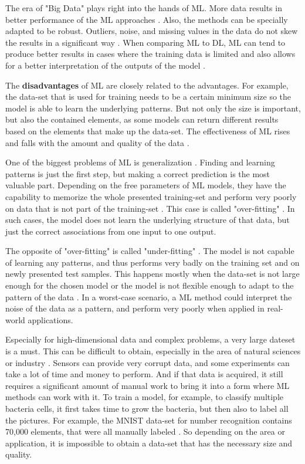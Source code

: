 The era of "Big Data" plays right into the hands of ML. More data results in better performance of the ML approaches \cite{Wuest}. Also, the methods can be specially adapted to be robust. Outliers, noise, and missing values in the data do not skew the results in a significant way \cite{Theodoridis}. When comparing ML to DL, ML can tend to produce better results in cases where the training data is limited and also allows for a better interpretation of the outputs of the model \cite{Janiesch}.

The \textbf{disadvantages} of ML are closely related to the advantages. For example, the data-set that is used for training needs to be a certain minimum size so the model is able to learn the underlying patterns. But not only the size is important, but also the contained elements, as some models can return different results based on the elements that make up the data-set. The effectiveness of ML rises and falls with the amount and quality of the data \cite{Janiesch, Bishop}.

One of the biggest problems of ML is generalization \cite{Bishop}. Finding and learning patterns is just the first step, but making a correct prediction is the most valuable part. Depending on the free parameters of ML models, they have the capability to memorize the whole presented training-set and perform very poorly on data that is not part of the training-set \cite{Zhangpiml}. This case is called "over-fitting" \cite{Jabbar}. In such cases, the model does not learn the underlying structure of that data, but just the correct associations from one input to one output. 

The opposite of "over-fitting" is called "under-fitting" \cite{Jabbar}. The model is not capable of learning any patterns, and thus performs very badly on the training set and on newly presented test samples. This happens mostly when the data-set is not large enough for the chosen model or the model is not flexible enough to adapt to the pattern of the data \cite{Will}. In a worst-case scenario, a ML method could interpret the noise of the data as a pattern, and perform very poorly when applied in real-world applications.\newline

Especially for high-dimensional data and complex problems, a very large dateset is a must. This can be difficult to obtain, especially in the area of natural sciences or industry \cite{Wuest}. Sensors can provide very corrupt data, and some experiments can take a lot of time and money to perform. And if that data is acquired, it still requires a significant amount of manual work to bring it into a form where ML methods can work with it. To train a model, for example, to classify multiple bacteria cells, it first takes time to grow the bacteria, but then also to label all the pictures. For example, the MNIST data-set for number recognition contains 70,000 elements, that were all manually labeled \cite{Pavlo}. So depending on the area or application, it is impossible to obtain a data-set that has the necessary size and quality. 

